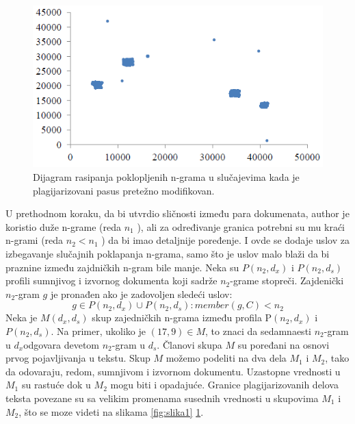 \documentclass[a4paper]{article}
\begin{document}
\begin{figure}[h!]
\begin{center}
\includegraphics[natwidth=525, natheight=294,scale=0.5]{slika2.PNG}
\end{center}
\caption{Dijagram rasipanja poklopljenih n-grama u slučajevima kada je plagijarizovani pasus pretežno modifikovan.}
\label{fig:slika2}
\end{figure}

\par U prethodnom koraku, da bi utvrdio sličnosti između para dokumenata, author je koristio duže n-grame (reda \(n_{1}\) ), ali za određivanje granica potrebni su mu kraći n-grami (reda \(n_{2} < n_{1}\) ) da bi imao detaljnije poređenje. I ovde se dodaje uslov za izbegavanje  slučajnih poklapanja n-grama, samo što je uslov malo blaži da bi praznine između zajdničkih n-gram bile manje. Neka su \(P(n_{2}, d_{x})\) i \(P(n_{2}, d_{s})\) profili sumnjivog i izvornog dokumenta koji sadrže \(n_{2}\)-grame stopreči. Zajdenički \(n_{2}\)-gram \(g\) je pronađen ako je zadovoljen sledeći uslov:
 \[g \in P(n_{2} ,d_{x}) \cup P(n_{2} ,d_{s} ): member(g,C)<n_{2}\]
Neka je \(M(d_{x},d_{s})\) skup zajedničkih n-grama između profila P\((n_{2},d_{x})\) i \(P(n_{2},d_{s})\). Na primer, ukoliko je \((17,9) \in M\), to 
znaci da sedamnaesti \(n_{2}\)-gram u \(d_{x}\)odgovara devetom \(n_{2}\)-gram u \(d_{s}\). Članovi skupa \(M\) su poređani na osnovi prvog pojavljivanja u 
tekstu. Skup \(M\) možemo podeliti na dva dela \(M_{1}\) i \(M_{2}\), tako da odovaraju, redom, sumnjivom i izvornom dokumentu. Uzastopne vrednosti u 
\(M_{1}\) su rastuće dok u \(M_{2}\) mogu biti  i opadajuće. Granice plagijarizovanih delova teksta povezane su sa velikim promenama susednih vrednosti u 
skupovima \(M_{1}\) i \(M_{2}\), što se moze videti na slikama \ref{fig:slika1} \ref{fig:slika2}.
\end{document}
